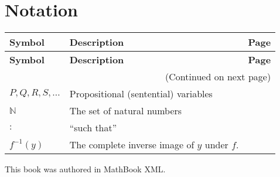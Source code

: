 \documentclass[10pt,]{memoir}
\theoremstyle{plain}
\theoremstyle{definition}
\theoremstyle{definition}
\theoremstyle{definition}
\numberwithin{equation}{chapter}
\def\N{\mathbb N}
\def\inv{^{-1}}
\def\st{:}
\begin{document}
\chapter[Notation]{Notation}\label{appendix-2}
\begin{longtable}[l]{llr}
\textbf{Symbol}&\textbf{Description}&\textbf{Page}\\[1em]
\endfirsthead
\textbf{Symbol}&\textbf{Description}&\textbf{Page}\\[1em]
\endhead
\multicolumn{3}{r}{(Continued on next page)}\\
\endfoot
\endlastfoot
$
                    P, Q, R, S, \ldots
                $&Propositional (sentential) variables&\pageref{notation-1}\\
$\N$&The set of natural numbers&\pageref{notation-2}\\
$\st$&``such that''&\pageref{notation-3}\\
$f\inv(y)$&The complete inverse image of \(y\) under \(f\).&\pageref{notation-4}\\
\end{longtable}
%
\backmatter
%
%
\printindex
%
\cleardoublepage
\pagestyle{empty}
\centerline{
    This book was authored in MathBook XML.
}
\end{document}

